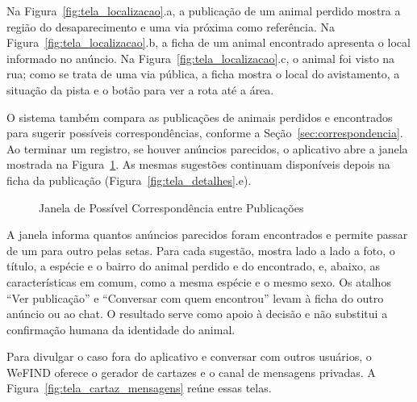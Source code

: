 Na Figura~\ref{fig:tela_localizacao}.a, a publicação de um animal perdido mostra a região do desaparecimento e uma via próxima como referência. Na Figura~\ref{fig:tela_localizacao}.b, a ficha de um animal encontrado apresenta o local informado no anúncio. Na Figura~\ref{fig:tela_localizacao}.c, o animal foi visto na rua; como se trata de uma via pública, a ficha mostra o local do avistamento, a situação da pista e o botão para ver a rota até a área.

O sistema também compara as publicações de animais perdidos e encontrados para sugerir possíveis correspondências, conforme a Seção~\ref{sec:correspondencia}. Ao terminar um registro, se houver anúncios parecidos, o aplicativo abre a janela mostrada na Figura~\ref{fig:tela_correspondencias}. As mesmas sugestões continuam disponíveis depois na ficha da publicação (Figura~\ref{fig:tela_detalhes}.e).

\begin{figure}[H]
    \centering
    \caption{Janela de Possível Correspondência entre Publicações}
    \label{fig:tela_correspondencias}
\end{figure}

A janela informa quantos anúncios parecidos foram encontrados e permite passar de um para outro pelas setas. Para cada sugestão, mostra lado a lado a foto, o título, a espécie e o bairro do animal perdido e do encontrado, e, abaixo, as características em comum, como a mesma espécie e o mesmo sexo. Os atalhos ``Ver publicação'' e ``Conversar com quem encontrou'' levam à ficha do outro anúncio ou ao chat. O resultado serve como apoio à decisão e não substitui a confirmação humana da identidade do animal.

Para divulgar o caso fora do aplicativo e conversar com outros usuários, o WeFIND oferece o gerador de cartazes e o canal de mensagens privadas. A Figura~\ref{fig:tela_cartaz_mensagens} reúne essas telas.

